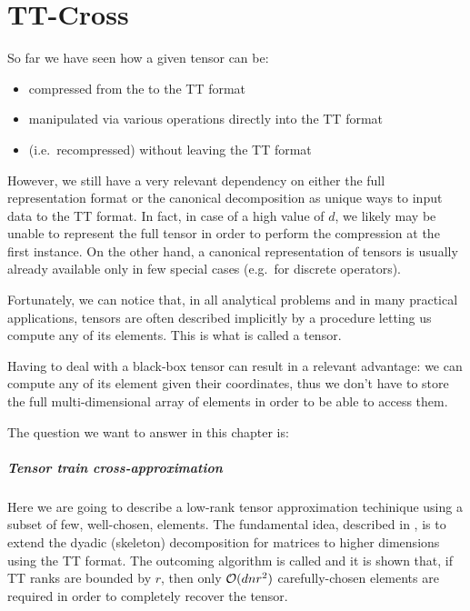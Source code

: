 \chapter{TT-Cross}
So far we have seen how a given tensor can be:
\begin{itemize}
\item compressed from the  to the TT format
\item manipulated via various operations directly into the TT format
\item {} (i.e.\ recompressed) without leaving the TT format
\end{itemize}

However, we still have a very relevant dependency on either the full representation format or the canonical decomposition as unique ways to input data to the TT format.
In fact, in case of a high value of $d$, we likely may be unable to represent the full tensor in order to perform the compression at the first instance. On the other hand, a canonical representation of tensors is usually already available only in few special cases (e.g.\ for discrete operators).

Fortunately, we can notice that, in all analytical problems and in many practical applications, tensors are often described implicitly by a procedure letting us compute any of its elements.
This is what is called a  tensor.

Having to deal with a black-box tensor can result in a relevant advantage: we can compute any of its element given their coordinates, thus we don't have to store the full multi-dimensional array of elements in order to be able to access them.

The question we want to answer in this chapter is: 

\paragraph{Tensor train cross-approximation}
Here we are going to describe a low-rank tensor approximation techinique using a subset of few, well-chosen, elements.
The fundamental idea, described in \cite{tt-cross}, is to extend the dyadic (skeleton) decomposition for matrices to higher dimensions using the TT format.
The outcoming algorithm is called  and it is shown that, if TT ranks are bounded by $r$, then only $\mathcal{O}(dnr^2)$ carefully-chosen elements are required in order to completely recover the tensor.

